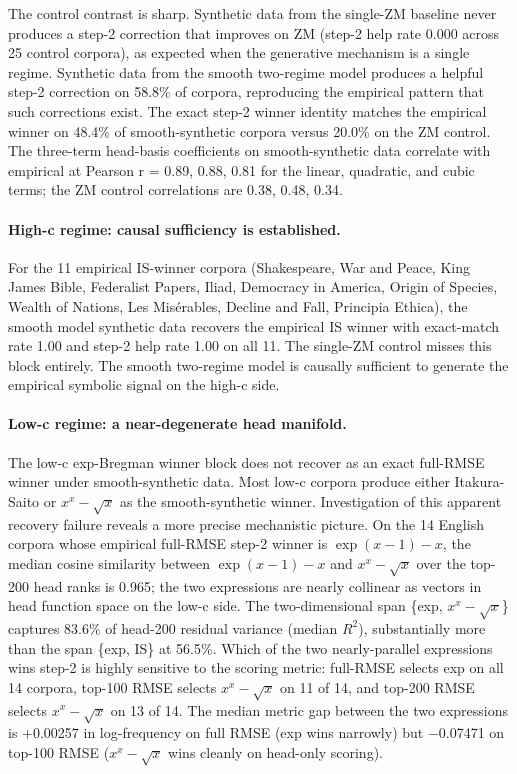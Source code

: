 \documentclass[11pt]{article}
\begin{document}
The control contrast is sharp. Synthetic data from the single-ZM baseline never produces a step-2 correction that improves on ZM (step-2 help rate 0.000 across 25 control corpora), as expected when the generative mechanism is a single regime. Synthetic data from the smooth two-regime model produces a helpful step-2 correction on 58.8\% of corpora, reproducing the empirical pattern that such corrections exist. The exact step-2 winner identity matches the empirical winner on 48.4\% of smooth-synthetic corpora versus 20.0\% on the ZM control. The three-term head-basis coefficients on smooth-synthetic data correlate with empirical at Pearson r = 0.89, 0.88, 0.81 for the linear, quadratic, and cubic terms; the ZM control correlations are 0.38, 0.48, 0.34.

\paragraph{High-c regime: causal sufficiency is established.} For the 11 empirical IS-winner corpora (Shakespeare, War and Peace, King James Bible, Federalist Papers, Iliad, Democracy in America, Origin of Species, Wealth of Nations, Les Misérables, Decline and Fall, Principia Ethica), the smooth model synthetic data recovers the empirical IS winner with exact-match rate 1.00 and step-2 help rate 1.00 on all 11. The single-ZM control misses this block entirely. The smooth two-regime model is causally sufficient to generate the empirical symbolic signal on the high-c side.

\paragraph{Low-c regime: a near-degenerate head manifold.} The low-c exp-Bregman winner block does not recover as an exact full-RMSE winner under smooth-synthetic data. Most low-c corpora produce either Itakura-Saito or $x^x-\sqrt{x}$ as the smooth-synthetic winner. Investigation of this apparent recovery failure reveals a more precise mechanistic picture. On the 14 English corpora whose empirical full-RMSE step-2 winner is $\exp(x-1)-x$, the median cosine similarity between $\exp(x-1)-x$ and $x^x-\sqrt{x}$ over the top-200 head ranks is 0.965; the two expressions are nearly collinear as vectors in head function space on the low-c side. The two-dimensional span \{exp, $x^x-\sqrt{x}$\} captures 83.6\% of head-200 residual variance (median $R^2$), substantially more than the span \{exp, IS\} at 56.5\%. Which of the two nearly-parallel expressions wins step-2 is highly sensitive to the scoring metric: full-RMSE selects exp on all 14 corpora, top-100 RMSE selects $x^x-\sqrt{x}$ on 11 of 14, and top-200 RMSE selects $x^x-\sqrt{x}$ on 13 of 14. The median metric gap between the two expressions is +0.00257 in log-frequency on full RMSE (exp wins narrowly) but −0.07471 on top-100 RMSE ($x^x-\sqrt{x}$ wins cleanly on head-only scoring).
\end{document}
